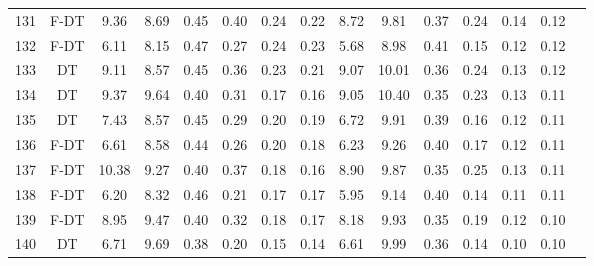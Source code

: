 \begin{longtable}{@{\hskip3pt}c@{\hskip3pt}c@{\hskip3pt}c@{\hskip3pt}c@{\hskip3pt}c@{\hskip3pt}c@{\hskip3pt}c@{\hskip3pt}c@{\hskip3pt}c@{\hskip3pt}c@{\hskip3pt}c@{\hskip3pt}c@{\hskip3pt}c@{\hskip3pt}c@{\hskip3pt}c}
        131 &           F-DT &              9.36 &        8.69 &          0.45 &        0.40 &        0.24 &         0.22 &                8.72 &        9.81 &          0.37 &        0.24 &        0.14 &         0.12 \\
        132 &           F-DT &              6.11 &        8.15 &          0.47 &        0.27 &        0.24 &         0.23 &                5.68 &        8.98 &          0.41 &        0.15 &        0.12 &         0.12 \\
        133 &             DT &              9.11 &        8.57 &          0.45 &        0.36 &        0.23 &         0.21 &                9.07 &       10.01 &          0.36 &        0.24 &        0.13 &         0.12 \\
        134 &             DT &              9.37 &        9.64 &          0.40 &        0.31 &        0.17 &         0.16 &                9.05 &       10.40 &          0.35 &        0.23 &        0.13 &         0.11 \\
        135 &             DT &              7.43 &        8.57 &          0.45 &        0.29 &        0.20 &         0.19 &                6.72 &        9.91 &          0.39 &        0.16 &        0.12 &         0.11 \\
        136 &           F-DT &              6.61 &        8.58 &          0.44 &        0.26 &        0.20 &         0.18 &                6.23 &        9.26 &          0.40 &        0.17 &        0.12 &         0.11 \\
        137 &           F-DT &             10.38 &        9.27 &          0.40 &        0.37 &        0.18 &         0.16 &                8.90 &        9.87 &          0.35 &        0.25 &        0.13 &         0.11 \\
        138 &           F-DT &              6.20 &        8.32 &          0.46 &        0.21 &        0.17 &         0.17 &                5.95 &        9.14 &          0.40 &        0.14 &        0.11 &         0.11 \\
        139 &           F-DT &              8.95 &        9.47 &          0.40 &        0.32 &        0.18 &         0.17 &                8.18 &        9.93 &          0.35 &        0.19 &        0.12 &         0.10 \\
        140 &             DT &              6.71 &        9.69 &          0.38 &        0.20 &        0.15 &         0.14 &                6.61 &        9.99 &          0.36 &        0.14 &        0.10 &         0.10 \\

\end{longtable}
